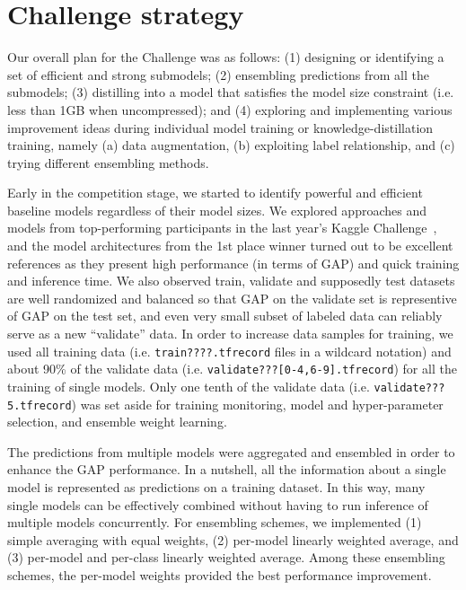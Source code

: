 \documentclass[runningheads]{llncs}
\begin{document}
\section{Challenge strategy}
Our overall plan for the Challenge was as follows:
(1) designing or identifying a set of efficient and strong submodels;
(2) ensembling predictions from all the submodels;
(3) distilling into a model that satisfies the model size constraint (i.e. less than 1GB when uncompressed); and
(4) exploring and implementing various improvement ideas during individual model training or knowledge-distillation training, namely (a) data augmentation, (b) exploiting label relationship, and (c) trying different ensembling methods.

Early in the competition stage, we started to identify powerful and efficient baseline models regardless of their model sizes.
We explored approaches and models from top-performing participants in the last year's Kaggle Challenge~\cite{kaggle2017}, and the model architectures from the 1st place winner \cite{miech2017} turned out to be excellent references as they present high performance (in terms of GAP) and quick training and inference time.
We also observed train, validate and supposedly test datasets are well randomized and balanced so that GAP on the validate set is representive of GAP on the test set, and even very small subset of labeled data can reliably serve as a new ``validate'' data.
In order to increase data samples for training, we used all training data (i.e. \texttt{train????.tfrecord} files in a wildcard notation) and about 90\% of the validate data (i.e. \texttt{validate???[0-4,6-9].tfrecord}) for all the training of single models.
Only one tenth of the validate data (i.e. \texttt{validate???5.tfrecord}) was set aside for training monitoring, model and hyper-parameter selection, and ensemble weight learning.

The predictions from multiple models were aggregated and ensembled in order to enhance the GAP performance.
In a nutshell, all the information about a single model is represented as predictions on a training dataset.
In this way, many single models can be effectively combined without having to run inference of multiple models concurrently.
For ensembling schemes, we implemented (1) simple averaging with equal weights, (2) per-model linearly weighted average, and (3) per-model and per-class linearly weighted average.
Among these ensembling schemes, the per-model weights provided the best performance improvement.
\end{document}
